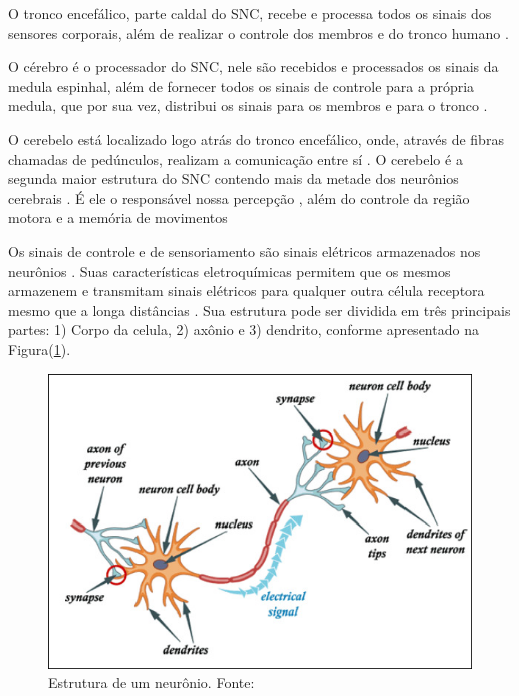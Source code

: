 O tronco encefálico, parte caldal do SNC,	 recebe e processa todos os sinais dos sensores corporais, além de realizar o controle dos membros e do tronco humano \cite{KANDEL}.

O cérebro é o processador do SNC, nele são recebidos e processados os sinais da medula espinhal, além de fornecer todos os sinais de controle para a própria medula, que por sua vez, distribui os sinais para os membros e para o tronco \cite{KANDEL}.

O cerebelo está localizado logo atrás do tronco encefálico, onde, através de fibras chamadas de pedúnculos, realizam a comunicação entre sí \cite{KANDEL}. O cerebelo é a segunda maior estrutura do SNC contendo mais da metade dos neurônios cerebrais \cite{SIULYDissertacao}. É ele o responsável nossa percepção \cite{alvarezneurobiomecanismos}, além do controle da região motora e a memória de movimentos \cite{SIULYDissertacao,alvarezneurobiomecanismos}

Os sinais de controle e de sensoriamento são sinais elétricos armazenados nos neurônios \cite{KANDEL}. Suas características eletroquímicas permitem que os mesmos armazenem e transmitam sinais elétricos para qualquer outra célula receptora mesmo que a longa distâncias \cite{SIULYDissertacao}. Sua estrutura pode ser dividida em três principais partes: 1) Corpo da celula, 2) axônio e 3) dendrito, conforme apresentado na Figura(\ref{neuronParts}).
\begin{figure}[h]
	\centering
	\includegraphics[keepaspectratio=true,scale=1.0]{figuras/Estrutura_neuronio.PNG}
	\caption{Estrutura de um neurônio. Fonte: \cite{SIULYDissertacao}}
	\label{neuronParts}
\end{figure}

